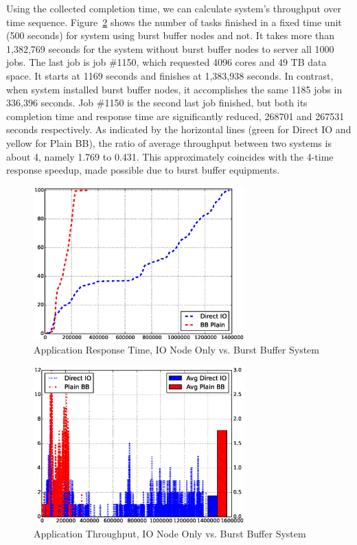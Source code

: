 Using the collected completion time, we can calculate system's throughput over time sequence.
Figure~\ref{Fig:DirectIOvsBBThroughput} shows the number of tasks finished
in a fixed time unit (500 seconds) for system using burst buffer nodes and not.
It takes more than 1,382,769 seconds for the system without burst buffer nodes to
server all 1000 jobs.
The last job is job \#1150, which requested 4096 cores and 49 TB data space.
It starts at 1169 seconds and finishes at 1,383,938 seconds.
In contrast, when system installed burst buffer nodes,
it accomplishes the same 1185 jobs in 336,396 seconds.
Job \#1150 is the second last job finished, but both its completion time and response time
are significantly reduced, 268701 and 267531 seconds respectively.
As indicated by the horizontal lines (green for Direct IO and yellow for Plain BB),
the ratio of average throughput between two systems is about 4, namely 1.769 to 0.431.
This approximately coincides with the 4-time response speedup,
made possible due to burst buffer equipments.


\begin{figure}[!t]
\centering
\includegraphics[width=3.2in]{DrawDirectIOvsBB/1000jobs_direct_vs_bb_response}
\caption{Application Response Time, IO Node Only vs. Burst Buffer System}
\label{Fig:DirectIOvsBBResponse}
\end{figure}

\begin{figure}[!t]
\centering
\includegraphics[width=3.2in]{DrawDirectIOvsBB/1000jobs_direct_vs_bb_throughput}
\caption{Application Throughput, IO Node Only vs. Burst Buffer System}
\label{Fig:DirectIOvsBBThroughput}
\end{figure}



